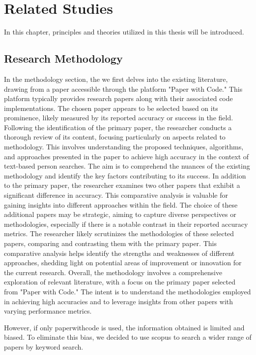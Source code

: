 \chapter{Related Studies }
In this chapter, principles and theories utilized in this thesis will be introduced.


\section{Research Methodology}
In the methodology section, the we first delves into the existing literature, drawing from a paper accessible through the platform "Paper with Code." This platform typically provides research papers along with their associated code implementations. The chosen paper appears to be selected based on its prominence, likely measured by its reported accuracy or success in the field.
Following the identification of the primary paper, the researcher conducts a thorough review of its content, focusing particularly on aspects related to methodology. This involves understanding the proposed techniques, algorithms, and approaches presented in the paper to achieve high accuracy in the context of text-based person searches. The aim is to comprehend the nuances of the existing methodology and identify the key factors contributing to its success.
In addition to the primary paper, the researcher examines two other papers that exhibit a significant difference in accuracy. This comparative analysis is valuable for gaining insights into different approaches within the field. The choice of these additional papers may be strategic, aiming to capture diverse perspectives or methodologies, especially if there is a notable contrast in their reported accuracy metrics.
The researcher likely scrutinizes the methodologies of these selected papers, comparing and contrasting them with the primary paper. This comparative analysis helps identify the strengths and weaknesses of different approaches, shedding light on potential areas of improvement or innovation for the current research.
Overall, the methodology involves a comprehensive exploration of relevant literature, with a focus on the primary paper selected from "Paper with Code." The intent is to understand the methodologies employed in achieving high accuracies and to leverage insights from other papers with varying performance metrics. 

However, if only paperwithcode is used, the information obtained is limited and biased. To eliminate this bias, we decided to use scopus to search a wider range of papers by keyword search.

